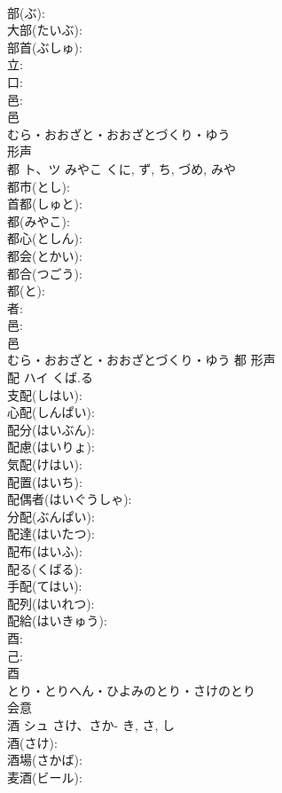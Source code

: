 \documentclass[8pt]{extreport}
\begin{document}
\begin{CJK}{UTF8}{min}
\\	部(ぶ): 
\\	大部(たいぶ): 
\\	部首(ぶしゅ): 
\\	立: 
\\	口: 
\\	邑: 
\\	邑	
\\	むら・おおざと・おおざとづくり・ゆう	
\\	形声 
\\	都	ト、ツ	みやこ	くに, ず, ち, づめ, みや	
\\	都市(とし): 
\\	首都(しゅと): 
\\	都(みやこ): 
\\	都心(としん): 
\\	都会(とかい): 
\\	都合(つごう): 
\\	都(と): 
\\	者: 
\\	邑: 
\\	邑	
\\	むら・おおざと・おおざとづくり・ゆう	都	形声 
\\	配	ハイ	くば.る		
\\	支配(しはい): 
\\	心配(しんぱい): 
\\	配分(はいぶん): 
\\	配慮(はいりょ): 
\\	気配(けはい): 
\\	配置(はいち): 
\\	配偶者(はいぐうしゃ): 
\\	分配(ぶんぱい): 
\\	配達(はいたつ): 
\\	配布(はいふ): 
\\	配る(くばる): 
\\	手配(てはい): 
\\	配列(はいれつ): 
\\	配給(はいきゅう): 
\\	酉: 
\\	己: 
\\	酉	
\\	とり・とりへん・ひよみのとり・さけのとり	
\\	会意 
\\	酒	シュ	さけ、さか-	き, さ, し	
\\	酒(さけ): 
\\	酒場(さかば): 
\\	麦酒(ビール): 

\end{CJK}
\end{document}
